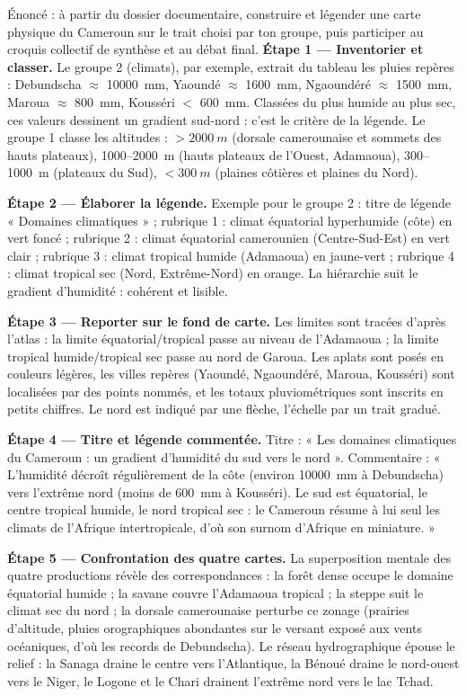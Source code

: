 \documentclass[11pt]{article}
\begin{document}
\begin{exoresolu}
Énoncé : à partir du dossier documentaire, construire et légender une carte physique du Cameroun sur le trait choisi par ton groupe, puis participer au croquis collectif de synthèse et au débat final.
\tcblower
\textbf{Étape 1 — Inventorier et classer.} Le groupe 2 (climats), par exemple, extrait du tableau les pluies repères : Debundscha $\approx$ \SI{10000}{mm}, Yaoundé $\approx$ \SI{1600}{mm}, Ngaoundéré $\approx$ \SI{1500}{mm}, Maroua $\approx$ \SI{800}{mm}, Kousséri $<$ \SI{600}{mm}. Classées du plus humide au plus sec, ces valeurs dessinent un gradient sud-nord : c'est le critère de la légende. Le groupe 1 classe les altitudes : $> \SI{2000}{m}$ (dorsale camerounaise et sommets des hauts plateaux), \num{1000}--\SI{2000}{m} (hauts plateaux de l'Ouest, Adamaoua), \num{300}--\SI{1000}{m} (plateaux du Sud), $< \SI{300}{m}$ (plaines côtières et plaines du Nord).

\textbf{Étape 2 — Élaborer la légende.} Exemple pour le groupe 2 : titre de légende « Domaines climatiques » ; rubrique 1 : climat équatorial hyperhumide (côte) en vert foncé ; rubrique 2 : climat équatorial camerounien (Centre-Sud-Est) en vert clair ; rubrique 3 : climat tropical humide (Adamaoua) en jaune-vert ; rubrique 4 : climat tropical sec (Nord, Extrême-Nord) en orange. La hiérarchie suit le gradient d'humidité : cohérent et lisible.

\textbf{Étape 3 — Reporter sur le fond de carte.} Les limites sont tracées d'après l'atlas : la limite équatorial/tropical passe au niveau de l'Adamaoua ; la limite tropical humide/tropical sec passe au nord de Garoua. Les aplats sont posés en couleurs légères, les villes repères (Yaoundé, Ngaoundéré, Maroua, Kousséri) sont localisées par des points nommés, et les totaux pluviométriques sont inscrits en petits chiffres. Le nord est indiqué par une flèche, l'échelle par un trait gradué.

\textbf{Étape 4 — Titre et légende commentée.} Titre : « Les domaines climatiques du Cameroun : un gradient d'humidité du sud vers le nord ». Commentaire : « L'humidité décroît régulièrement de la côte (environ \SI{10000}{mm} à Debundscha) vers l'extrême nord (moins de \SI{600}{mm} à Kousséri). Le sud est équatorial, le centre tropical humide, le nord tropical sec : le Cameroun résume à lui seul les climats de l'Afrique intertropicale, d'où son surnom d'Afrique en miniature. »

\textbf{Étape 5 — Confrontation des quatre cartes.} La superposition mentale des quatre productions révèle des correspondances : la forêt dense occupe le domaine équatorial humide ; la savane couvre l'Adamaoua tropical ; la steppe suit le climat sec du nord ; la dorsale camerounaise perturbe ce zonage (prairies d'altitude, pluies orographiques abondantes sur le versant exposé aux vents océaniques, d'où les records de Debundscha). Le réseau hydrographique épouse le relief : la Sanaga draine le centre vers l'Atlantique, la Bénoué draine le nord-ouest vers le Niger, le Logone et le Chari drainent l'extrême nord vers le lac Tchad.


\end{exoresolu}
\end{document}
